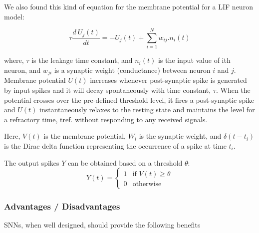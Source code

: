 \documentclass[11pt]{article}
\begin{document}
\pagebreak

\begin{mdframed}[frametitle={Note:}]

  We also found this kind of equation for the membrane potential for a LIF neuron model:

  $$
    \tau \frac{d \: U_j(t)}{dt} = - U_j(t) + \sum_{i=1}^{N} w_{ij} . n_i(t)
  $$

  where, $\tau$ is the leakage time constant, and $n_i(t)$ is the input value of ith neuron, and $w_{ji}$ is a synaptic weight (conductance) between neuron $i$ and $j$. Membrane potential $U(t)$ increases whenever post-synaptic spike is generated by input spikes and it will decay spontaneously with time constant, $\tau$. When the potential crosses over the pre-defined threshold level, it fires a post-synaptic spike and $U(t)$ instantaneously relaxes to the resting state and maintains the level for a refractory time, tref. without responding to any received signals.\cite{memristor_synapses}

  Here, \(V(t)\) is the membrane potential, \(W_i\) is the synaptic weight, and \(\delta(t - t_i)\) is the Dirac delta function representing the occurrence of a spike at time \(t_i\).

  The output spikes \(Y\) can be obtained based on a threshold \( \theta \):
  $$
    Y(t) =
    \begin{cases}
      1 & \text{if } V(t) \geq \theta \\
      0 & \text{otherwise}
    \end{cases}
  $$

\end{mdframed}

\subsubsection{Advantages / Disadvantages}

SNNs, when well designed, should provide the following benefits
\end{document}
